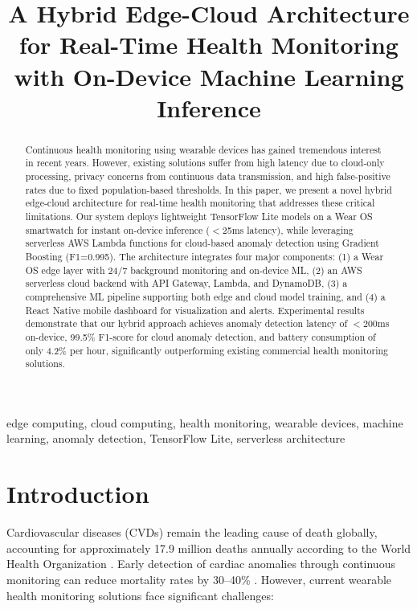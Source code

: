 \documentclass[conference]{IEEEtran}
\begin{document}
\title{A Hybrid Edge-Cloud Architecture for Real-Time Health Monitoring with On-Device Machine Learning Inference}

\author{
}

\maketitle

\begin{abstract}
Continuous health monitoring using wearable devices has gained tremendous interest in recent years. However, existing solutions suffer from high latency due to cloud-only processing, privacy concerns from continuous data transmission, and high false-positive rates due to fixed population-based thresholds. In this paper, we present a novel hybrid edge-cloud architecture for real-time health monitoring that addresses these critical limitations. Our system deploys lightweight TensorFlow Lite models on a Wear OS smartwatch for instant on-device inference ($<$25ms latency), while leveraging serverless AWS Lambda functions for cloud-based anomaly detection using Gradient Boosting (F1=0.995). The architecture integrates four major components: (1) a Wear OS edge layer with 24/7 background monitoring and on-device ML, (2) an AWS serverless cloud backend with API Gateway, Lambda, and DynamoDB, (3) a comprehensive ML pipeline supporting both edge and cloud model training, and (4) a React Native mobile dashboard for visualization and alerts. Experimental results demonstrate that our hybrid approach achieves anomaly detection latency of $<$200ms on-device, 99.5\% F1-score for cloud anomaly detection, and battery consumption of only 4.2\% per hour, significantly outperforming existing commercial health monitoring solutions.
\end{abstract}

\begin{IEEEkeywords}
edge computing, cloud computing, health monitoring, wearable devices, machine learning, anomaly detection, TensorFlow Lite, serverless architecture
\end{IEEEkeywords}

\section{Introduction}
Cardiovascular diseases (CVDs) remain the leading cause of death globally, accounting for approximately 17.9 million deaths annually according to the World Health Organization \cite{who2021}. Early detection of cardiac anomalies through continuous monitoring can reduce mortality rates by 30--40\% \cite{early_detection}. However, current wearable health monitoring solutions face significant challenges:
\end{document}
